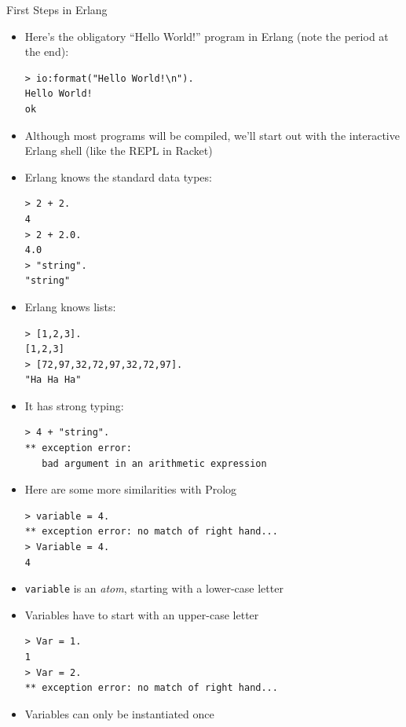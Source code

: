 \documentclass[12pt,xcolor=svgnames]{beamer}
\begin{document}
\begin{frame}{First Steps in Erlang}
\begin{itemize}
\item Here's the obligatory ``Hello World!'' program in Erlang (note the period at the end):
\begin{Verbatim}
> io:format("Hello World!\n").
Hello World!
ok
\end{Verbatim}
\item Although most programs will be compiled, we'll start out with the interactive Erlang shell (like the REPL in Racket)
\item Erlang knows the standard data types:
\begin{Verbatim}
> 2 + 2.
4
> 2 + 2.0.
4.0
> "string".
"string"
\end{Verbatim}
\end{itemize}

\framebreak

\begin{itemize}
\item Erlang knows lists:
\begin{Verbatim}
> [1,2,3].
[1,2,3]
> [72,97,32,72,97,32,72,97].   
"Ha Ha Ha"
\end{Verbatim}
\item It has strong typing:
\begin{Verbatim}
> 4 + "string".
** exception error: 
   bad argument in an arithmetic expression
\end{Verbatim}
\end{itemize}

\framebreak

\begin{itemize}
\item Here are some more similarities with Prolog
\begin{Verbatim}
> variable = 4.
** exception error: no match of right hand...
> Variable = 4.
4
\end{Verbatim}
\item \texttt{variable} is an \emph{atom}, starting with a lower-case letter
\item Variables have to start with an upper-case letter
\begin{Verbatim}
> Var = 1.
1
> Var = 2.
** exception error: no match of right hand...
\end{Verbatim}
\item Variables can only be instantiated once
\end{itemize}
\end{frame}
\end{document}
